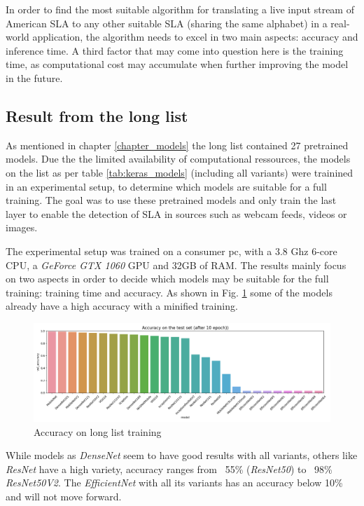 In order to find the most suitable algorithm for translating a live input stream of American SLA to any other suitable SLA (sharing the same alphabet) in a real-world application, the algorithm needs to excel in two main aspects: accuracy and inference time. A third factor that may come into question here is the training time, as computational cost may accumulate when further improving the model in the future.

\subsection{Result from the long list}
As mentioned in chapter \ref{chapter_models} the long list contained 27 pretrained models. Due the the limited availability of computational ressources, the models on the list as per table \ref{tab:keras_models} (including all variants) were trainined in an experimental setup, to determine which models are suitable for a full training. The goal was to use these pretrained models and only train the last layer to enable the detection of SLA in sources such as webcam feeds, videos or images.

The experimental setup was trained on a consumer pc, with a 3.8 Ghz 6-core CPU, a \textit{GeForce GTX 1060} GPU and 32GB of RAM. The results mainly focus on two aspects in order to decide which models may be suitable for the full training: training time and accuracy. As shown in Fig. \ref{fig:long_list_acc} some of the models already have a high accuracy with a minified training.

\begin{figure}[h]
    \centering
    \caption{Accuracy on long list training}
	\label{fig:long_list_acc}
    \includegraphics[width=\linewidth]{figures/long_val_accuracy.png}
\end{figure}

While models as \textit{DenseNet} seem to have good results with all variants, others like \textit{ResNet} have a high variety, accuracy ranges from ~55\% (\textit{ResNet50}) to ~98\% \textit{ResNet50V2}. The \textit{EfficientNet} with all its variants has an accuracy below 10\% and will not move forward.

